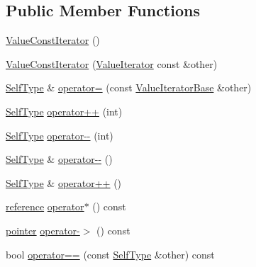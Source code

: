 \subsection*{Public Member Functions}
\begin{DoxyCompactItemize}
\item 
\hyperlink{classJson_1_1ValueConstIterator_a1b10a46f1606421b0663492a5f9a2aad}{Value\+Const\+Iterator} ()
\item 
\hyperlink{classJson_1_1ValueConstIterator_a7ef3df204a9ae83a0d8a3cd128e05c70}{Value\+Const\+Iterator} (\hyperlink{classJson_1_1ValueIterator}{Value\+Iterator} const \&other)
\item 
\hyperlink{classJson_1_1ValueIteratorBase_a9d2a940d03ea06d20d972f41a89149ee}{Self\+Type} \& \hyperlink{classJson_1_1ValueConstIterator_ad1b1c11f8d7fb22d4d3c231915f2b15b}{operator=} (const \hyperlink{classJson_1_1ValueIteratorBase}{Value\+Iterator\+Base} \&other)
\item 
\hyperlink{classJson_1_1ValueIteratorBase_a9d2a940d03ea06d20d972f41a89149ee}{Self\+Type} \hyperlink{classJson_1_1ValueConstIterator_ab3f0c2edbfc8f7d60645f3d597d05e28}{operator++} (int)
\item 
\hyperlink{classJson_1_1ValueIteratorBase_a9d2a940d03ea06d20d972f41a89149ee}{Self\+Type} \hyperlink{classJson_1_1ValueConstIterator_a94935961e9331c6f7b907b05ec8df75e}{operator-\/-\/} (int)
\item 
\hyperlink{classJson_1_1ValueIteratorBase_a9d2a940d03ea06d20d972f41a89149ee}{Self\+Type} \& \hyperlink{classJson_1_1ValueConstIterator_a31415e44e44e56fb2bfda7e8bb784646}{operator-\/-\/} ()
\item 
\hyperlink{classJson_1_1ValueIteratorBase_a9d2a940d03ea06d20d972f41a89149ee}{Self\+Type} \& \hyperlink{classJson_1_1ValueConstIterator_a2cfe2f7a94a688186efdafb1b181c319}{operator++} ()
\item 
\hyperlink{classJson_1_1ValueConstIterator_aa9b05c6a37cd352ea1ee6e13b816f709}{reference} \hyperlink{classJson_1_1ValueConstIterator_aeb44153d71c61ac9397a84d5ecc244c5}{operator$\ast$} () const 
\item 
\hyperlink{classJson_1_1ValueConstIterator_a400136bd8bc09e9fddec0785fa2cff14}{pointer} \hyperlink{classJson_1_1ValueConstIterator_ac493d31c8eede8af10b71415fe8e624b}{operator-\/$>$} () const 
\item 
bool \hyperlink{classJson_1_1ValueIteratorBase_afc656672ac28502f640ade32c38c1b56}{operator==} (const \hyperlink{classJson_1_1ValueIteratorBase_a9d2a940d03ea06d20d972f41a89149ee}{Self\+Type} \&other) const 

\end{DoxyCompactItemize}
